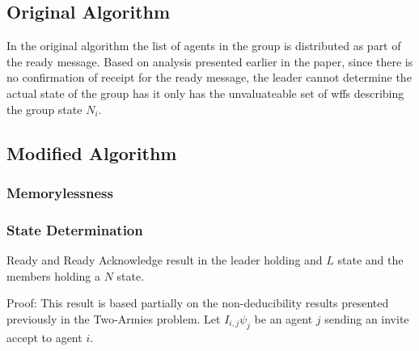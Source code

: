 \subsection{Original Algorithm}

In the original algorithm the list of agents in the group is distributed as part of the ready message. Based on analysis presented earlier in the paper, since there is no confirmation of receipt for the ready message, the leader cannot determine the actual state of the group has it only has the unvaluateable set of wffs describing the group state $N_i$.

\subsection{Modified Algorithm}

\subsubsection{Memorylessness}

\subsubsection{State Determination}

\begin{thm}
Ready and Ready Acknowledge result in the leader holding and $L$ state and the members holding a $N$ state.
\end{thm}

Proof: This result is based partially on the non-deducibility results presented previously in the Two-Armies problem. Let $I_{i,j} \psi_j$ be an agent $j$ sending an invite accept to agent $i$.

